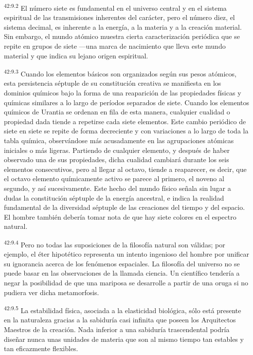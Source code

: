 \par
\textsuperscript{42:9.2} El número siete es fundamental en el universo central y en el sistema espiritual de las transmisiones inherentes del carácter, pero el número diez, el sistema decimal, es inherente a la energía, a la materia y a la creación material. Sin embargo, el mundo atómico muestra cierta caracterización periódica que se repite en grupos de siete ---una marca de nacimiento que lleva este mundo material y que indica su lejano origen espiritual.

\par
\textsuperscript{42:9.3} Cuando los elementos básicos son organizados según sus pesos atómicos, esta persistencia séptuple de su constitución creativa se manifiesta en los dominios químicos bajo la forma de una reaparición de las propiedades físicas y químicas similares a lo largo de períodos separados de siete. Cuando los elementos químicos de Urantia se ordenan en fila de esta manera, cualquier cualidad o propiedad dada tiende a repetirse cada siete elementos. Este cambio periódico de siete en siete se repite de forma decreciente y con variaciones a lo largo de toda la tabla química, observándose más acusadamente en las agrupaciones atómicas iniciales o más ligeras. Partiendo de cualquier elemento, y después de haber observado una de sus propiedades, dicha cualidad cambiará durante los seis elementos consecutivos, pero al llegar al octavo, tiende a reaparecer, es decir, que el octavo elemento químicamente activo se parece al primero, el noveno al segundo, y así sucesivamente. Este hecho del mundo físico señala sin lugar a dudas la constitución séptuple de la energía ancestral, e indica la realidad fundamental de la diversidad séptuple de las creaciones del tiempo y del espacio. El hombre también debería tomar nota de que hay siete colores en el espectro natural.

\par
\textsuperscript{42:9.4} Pero no todas las suposiciones de la filosofía natural son válidas; por ejemplo, el éter hipotético representa un intento ingenioso del hombre por unificar su ignorancia acerca de los fenómenos espaciales. La filosofía del universo no se puede basar en las observaciones de la llamada ciencia. Un científico tendería a negar la posibilidad de que una mariposa se desarrolle a partir de una oruga si no pudiera ver dicha metamorfosis.

\par
\textsuperscript{42:9.5} La estabilidad física, asociada a la elasticidad biológica, sólo está presente en la naturaleza gracias a la sabiduría casi infinita que poseen los Arquitectos Maestros de la creación. Nada inferior a una sabiduría trascendental podría diseñar nunca unas unidades de materia que son al mismo tiempo tan estables y tan eficazmente flexibles.

